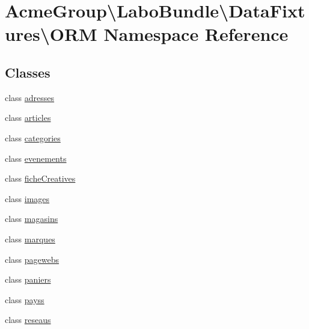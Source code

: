 \hypertarget{namespace_acme_group_1_1_labo_bundle_1_1_data_fixtures_1_1_o_r_m}{\section{Acme\+Group\textbackslash{}Labo\+Bundle\textbackslash{}Data\+Fixtures\textbackslash{}O\+R\+M Namespace Reference}
\label{namespace_acme_group_1_1_labo_bundle_1_1_data_fixtures_1_1_o_r_m}
}
\subsection*{Classes}
\begin{DoxyCompactItemize}
\item 
class \hyperlink{class_acme_group_1_1_labo_bundle_1_1_data_fixtures_1_1_o_r_m_1_1adresses}{adresses}
\item 
class \hyperlink{class_acme_group_1_1_labo_bundle_1_1_data_fixtures_1_1_o_r_m_1_1articles}{articles}
\item 
class \hyperlink{class_acme_group_1_1_labo_bundle_1_1_data_fixtures_1_1_o_r_m_1_1categories}{categories}
\item 
class \hyperlink{class_acme_group_1_1_labo_bundle_1_1_data_fixtures_1_1_o_r_m_1_1evenements}{evenements}
\item 
class \hyperlink{class_acme_group_1_1_labo_bundle_1_1_data_fixtures_1_1_o_r_m_1_1fiche_creatives}{fiche\+Creatives}
\item 
class \hyperlink{class_acme_group_1_1_labo_bundle_1_1_data_fixtures_1_1_o_r_m_1_1images}{images}
\item 
class \hyperlink{class_acme_group_1_1_labo_bundle_1_1_data_fixtures_1_1_o_r_m_1_1magasins}{magasins}
\item 
class \hyperlink{class_acme_group_1_1_labo_bundle_1_1_data_fixtures_1_1_o_r_m_1_1marques}{marques}
\item 
class \hyperlink{class_acme_group_1_1_labo_bundle_1_1_data_fixtures_1_1_o_r_m_1_1pagewebs}{pagewebs}
\item 
class \hyperlink{class_acme_group_1_1_labo_bundle_1_1_data_fixtures_1_1_o_r_m_1_1paniers}{paniers}
\item 
class \hyperlink{class_acme_group_1_1_labo_bundle_1_1_data_fixtures_1_1_o_r_m_1_1payss}{payss}
\item 
class \hyperlink{class_acme_group_1_1_labo_bundle_1_1_data_fixtures_1_1_o_r_m_1_1reseaus}{reseaus}

\end{DoxyCompactItemize}
